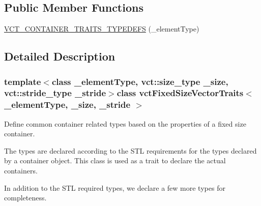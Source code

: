 \subsection*{Public Member Functions}
\begin{DoxyCompactItemize}
\item 
\hyperlink{classvct_fixed_size_vector_traits_a20cd9e1a643c4047776b3720eff1a722}{V\-C\-T\-\_\-\-C\-O\-N\-T\-A\-I\-N\-E\-R\-\_\-\-T\-R\-A\-I\-T\-S\-\_\-\-T\-Y\-P\-E\-D\-E\-F\-S} (\-\_\-element\-Type)
\end{DoxyCompactItemize}


\subsection{Detailed Description}
\subsubsection*{template$<$class \-\_\-element\-Type, vct\-::size\-\_\-type \-\_\-size, vct\-::stride\-\_\-type \-\_\-stride$>$class vct\-Fixed\-Size\-Vector\-Traits$<$ \-\_\-element\-Type, \-\_\-size, \-\_\-stride $>$}

Define common container related types based on the properties of a fixed size container. 

The types are declared according to the S\-T\-L requirements for the types declared by a container object. This class is used as a trait to declare the actual containers.

In addition to the S\-T\-L required types, we declare a few more types for completeness. 

